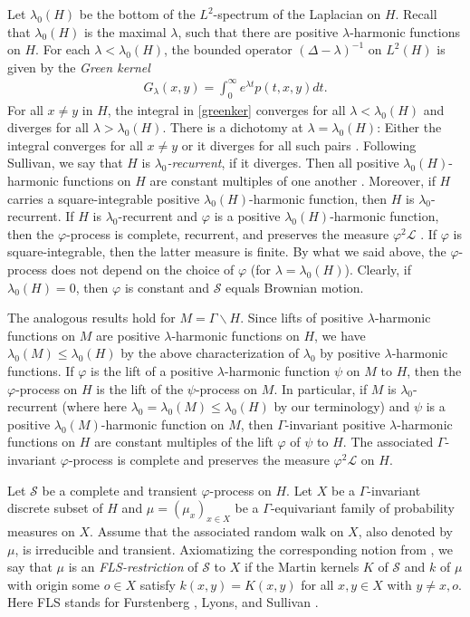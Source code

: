 \documentclass[12pt,a4paper]{amsart}
\numberwithin{equation}{section}
\theoremstyle{definition}
\def\vf{\varphi}
\begin{document}
Let  $\lambda_0(H)$ be the bottom of the $L^2$-spectrum of the Laplacian on $H$.
Recall that $\lambda_0(H)$ is the maximal $\lambda$, such that there are positive $\lambda$-harmonic functions on $H$.
For each $\lambda<\lambda_0(H)$, the bounded operator $(\Delta-\lambda)^{-1}$ on $L^2(H)$ is given by the \emph{Green kernel}
\begin{align}\label{greenker}
	G_\lambda(x,y) = \int_0^\infty e^{\lambda t}p(t,x,y)dt.
\end{align}
For all $x\ne y$ in $H$, the integral in \eqref{greenker} converges for all $\lambda<\lambda_0(H)$ and diverges for all $\lambda>\lambda_0(H)$.
There is a dichotomy at $\lambda=\lambda_0(H)$: Either the integral converges for all $x\ne y$ or it diverges for all such pairs \cite[Theorem 2.6]{Su3}.
Following Sullivan, we say that $H$ is \emph{$\lambda_0$-recurrent}, if it diverges.
Then all positive $\lambda_0(H)$-harmonic functions on $H$ are constant multiples of one another \cite[Theorem 2.7]{Su3}.
Moreover, if $H$ carries a square-integrable positive $\lambda_0(H)$-harmonic function, then $H$ is $\lambda_0$-recurrent.
If $H$ is $\lambda_0$-recurrent and $\vf$ is a positive $\lambda_0(H)$-harmonic function, then the $\vf$-process is complete, recurrent, and preserves the measure $\vf^2\mathcal L$ \cite[Theorem 2.10]{Su3}.
If $\vf$ is square-integrable, then the latter measure is finite.
By what we said above, the $\vf$-process does not depend on the choice of $\vf$ (for $\lambda=\lambda_0(H)$).
Clearly, if $\lambda_0(H)=0$, then $\vf$ is constant and $\mathcal S$ equals Brownian motion.

The analogous results hold for $M=\Gamma\backslash H$.
Since lifts of positive $\lambda$-harmonic functions on $M$ are positive $\lambda$-harmonic functions on $H$,
we have $\lambda_0(M)\le\lambda_0(H)$ by the above characterization of $\lambda_0$ by positive $\lambda$-harmonic functions.
If $\vf$ is the lift of a positive $\lambda$-harmonic function $\psi$ on $M$ to $H$, then the $\vf$-process on $H$ is the lift of the $\psi$-process on $M$.
In particular, if $M$ is $\lambda_0$-recurrent (where here $\lambda_0=\lambda_0(M)\le\lambda_0(H)$ by our terminology) and $\psi$ is a positive $\lambda_0(M)$-harmonic function on $M$, then $\Gamma$-invariant positive $\lambda$-harmonic functions on $H$ are constant multiples of the lift $\vf$ of $\psi$ to $H$.
The associated $\Gamma$-invariant $\vf$-process is complete and preserves the measure $\vf^2\mathcal{L}$ on $H$.

Let $\mathcal{S}$ be a complete and transient $\vf$-process on $H$.
Let $X$ be a $\Gamma$-invariant discrete subset of $H$ and $\mu=(\mu_x)_{x\in X}$ be a $\Gamma$-equivariant family of probability measures on $X$.
Assume that the associated random walk on $X$, also denoted  by $\mu$, is irreducible and transient.
Axiomatizing the corresponding notion from \cite{BP}, we say that $\mu$ is an \emph{FLS-restriction} of $\mathcal S$ to $X$ if the Martin kernels $K$ of $\mathcal{S}$ and $k$ of $\mu$ with origin some $o\in X$ satisfy $k(x,y)=K(x,y)$ for all $x,y\in X$ with $y\neq x, o$.
Here FLS stands for Furstenberg \cite{Fu}, Lyons, and Sullivan \cite{LS}.
\end{document}
